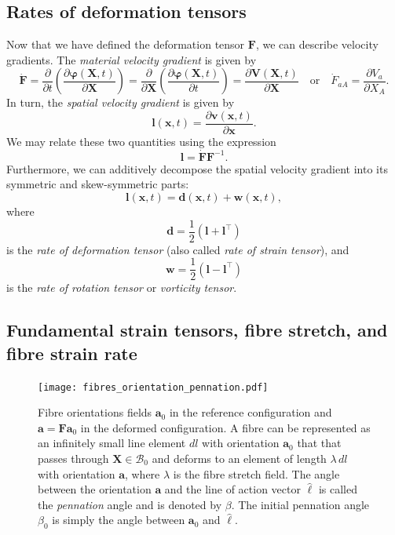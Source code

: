 \documentclass{sfuthesis}
\numberwithin{equation}{section}
\numberwithin{figure}{chapter}
\numberwithin{table}{chapter}
\theoremstyle{definition}
\def\*#1{{\mathbf{#1}}} %
\newcommand{\pder}[2]{\dfrac{\partial #1}{\partial #2}}
\newcommand{\B}{\mathcal{B}}
\newcommand{\T}{\top}
\def\bphi{{\bm{\varphi}}}
\begin{document}
\subsection{Rates of deformation tensors}

Now that we have defined the deformation tensor $\*F$, we can describe velocity gradients. The \textit{material velocity gradient} is given by
\begin{equation}
\dot{\*F} = \pder{}{t} \left( \pder{\bphi(\*X,t)}{\*X} \right) = \pder{}{\*X} \left( \pder{\bphi(\*X,t)}{t} \right) = \pder{\*V(\*X,t)}{\*X} \quad \text{or} \quad \dot{F}_{aA} = \pder{V_a}{X_A}.
\end{equation}
In turn, the \textit{spatial velocity gradient} is given by
\begin{equation}
\*l(\*x,t) = \pder{\*v(\*x,t)}{\*x}.
\end{equation}
We may relate these two quantities using the expression
\begin{equation} \label{eq:def_l_spatial_velocity_gradient}
\*l = \dot{\*F} \*F^{-1}.
\end{equation}
Furthermore, we can additively decompose the spatial velocity gradient into its symmetric and skew-symmetric parts:
\begin{equation}
\*l(\*x,t) = \*d(\*x,t) + \*w(\*x,t),
\end{equation}
where
\begin{equation}
\*d = \dfrac{1}{2}(\*l + \*l^\T)
\end{equation}
is the \textit{rate of deformation tensor} (also called \textit{rate of strain tensor}), and
\begin{equation}
\*w = \dfrac{1}{2}(\*l - \*l^\T)
\end{equation}
is the \textit{rate of rotation tensor} or \textit{vorticity tensor}. %

\subsection{Fundamental strain tensors, fibre stretch, and fibre strain rate}

\begin{figure}
    \centering
    \texttt{[image: fibres\_orientation\_pennation.pdf]}
    \caption{Fibre orientations fields $\*a_0$ in the reference configuration and $\*a = \*F \*a_0$ in the deformed configuration. A fibre can be represented as an infinitely small line element $dl$ with orientation $\*a_0$ that that passes through $\*X \in \B_0$ and deforms to an element of length $\lambda \, dl$ with orientation $\*a$, where $\lambda$ is the fibre stretch field. The angle between the orientation $\*a$ and the line of action vector $\widehat{\bm{\ell}}$ is called the \textit{pennation} angle and is denoted by $\beta$. The initial pennation angle $\beta_0$ is simply the angle between $\*a_0$ and $\widehat{\bm{\ell}}$. \label{fig:potato_line_element}}
\end{figure}
\end{document}
